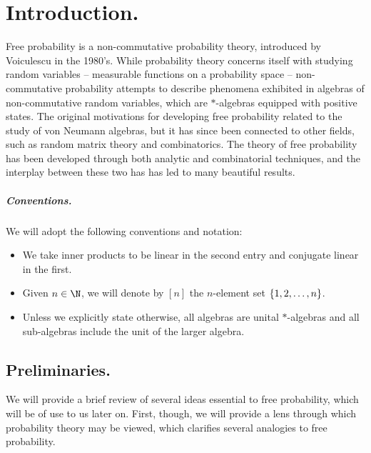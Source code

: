 \chapter{Introduction.}
Free probability is a non-commutative probability theory, introduced by Voiculescu in the 1980's.
While probability theory concerns itself with studying random variables -- measurable functions on a probability space -- non-commutative probability attempts to describe phenomena exhibited in algebras of non-commutative random variables, which are $*$-algebras equipped with positive states.
The original motivations for developing free probability related to the study of von Neumann algebras, but it has since been connected to other fields, such as random matrix theory and combinatorics.
The theory of free probability has been developed through both analytic and combinatorial techniques, and the interplay between these two has has led to many beautiful results.

\paragraph{Conventions.}
We will adopt the following conventions and notation:
\begin{itemize}
	\item We take inner products to be linear in the second entry and conjugate linear in the first.
	\item Given $n \in \N$, we will denote by $[n]$ the $n$-element set $\left\{1, 2, \ldots, n\right\}$.
	\item Unless we explicitly state otherwise, all algebras are unital $*$-algebras and all sub-algebras include the unit of the larger algebra.
\end{itemize}

\section{Preliminaries.}
We will provide a brief review of several ideas essential to free probability, which will be of use to us later on.
First, though, we will provide a lens through which probability theory may be viewed, which clarifies several analogies to free probability.


